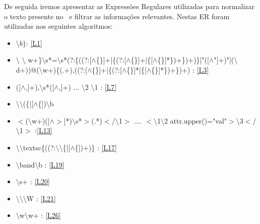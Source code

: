 \documentclass[11pt,a4paper]{report}
\begin{document}
De seguida iremos apresentar as Expressões Regulares utilizadas para normalizar o texto presente no \bib\ e filtrar as informações relevantes. Nestas ER foram utilizadas nos seguintes algoritmos:
\begin{itemize}
\item $\setminus b\}$: \ref{L1}

\item $\setminus$ $\setminus$ w+\}$\setminus$s*=$\setminus$s*(?:\{((?:[$\land$\{\}]+|\{(?:[$\land$\{\}]+|\{[$\land$\{\}]*\})+\})+)\}|"([$\land$"]+)"|($\setminus$d+))@($\setminus$w+)\{(.+),((?:[$\land$\{\}]+|\{(?:[$\land$\{\}]*|\{[$\land$\{\}]*\})+\})+) : \ref{L3}

\item ([$\land$,]+),$\setminus$s*([$\land$,]+) ... $\setminus$2 $\setminus$1 : \ref{L7}

\item $\setminus \setminus$(\{|[$\land$\{])$\setminus$b 

\item $<$($\setminus$w+)([$\land$$>$]*)$\setminus$s*$>$(.*)$<$/$\setminus$1$>$ .... $<$$\setminus$1$\setminus$2 {attr.upper()}="{val}"$>$$\setminus$3$<$/$\setminus$1$>$ :\ref{L13}

\item $\setminus \setminus$textsc\{((?:$\setminus \setminus$\{|[$\land$\{])+)\} : \ref{L17}

\item $\setminus$band$\setminus$b :  \ref{L19}

\item $\setminus$s+ : \ref{L20}

\item $\setminus \setminus \setminus$W : \ref{L21}

\item $\setminus$w$\setminus$w+ : \ref{L26}

\end{itemize}
\end{document}
